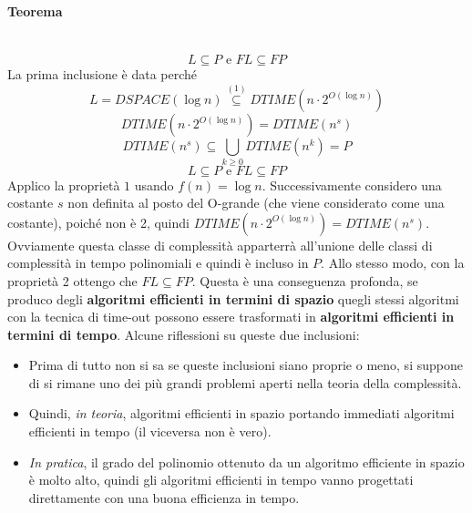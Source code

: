 \documentclass{article}
\begin{document}
\paragraph{Teorema}\mbox{}\\
$$L\subseteq P\text{ e }FL\subseteq FP$$
La prima inclusione è data perché
$$L=DSPACE(\log n)\overset{(1)}{\subseteq} DTIME(n\cdot 2^{O(\log n)})$$
$$DTIME(n\cdot 2^{O(\log n)})=DTIME(n^s)$$
$$DTIME(n^s)\subseteq \bigcup_{k\geq 0}DTIME(n^k)=P$$
$$L\subseteq P\text{ e }FL\subseteq FP$$
Applico la proprietà $1$ usando $f(n)=\log n$. Successivamente considero una costante $s$ non definita
al posto del O-grande (che viene considerato come una costante),
poiché non è 2, quindi $DTIME(n\cdot 2^{O(\log n)})=DTIME(n^s)$.
Ovviamente questa classe di complessità apparterrà all'unione delle classi di complessità in tempo polinomiali
e quindi è incluso in $P$. Allo stesso modo, con la proprietà 2 ottengo che $FL\subseteq FP$.
Questa è una conseguenza profonda, se produco degli \textbf{algoritmi efficienti in termini di spazio}
quegli stessi algoritmi con la tecnica di time-out possono essere trasformati in \textbf{algoritmi efficienti
in termini di tempo}.
Alcune riflessioni su queste due inclusioni:
\begin{itemize}
    \item Prima di tutto non si sa se queste inclusioni siano proprie o meno, si suppone di si
    rimane uno dei più grandi problemi aperti nella teoria della complessità.
    \item Quindi, \textit{in teoria}, algoritmi efficienti in spazio portando immediati
          algoritmi efficienti in tempo (il viceversa non è vero).
    \item \textit{In pratica}, il grado del polinomio ottenuto da un algoritmo efficiente
          in spazio è molto alto, quindi gli algoritmi efficienti in tempo vanno progettati
          direttamente con una buona efficienza in tempo.
\end{itemize}
\end{document}
